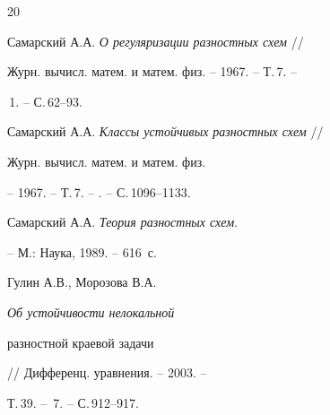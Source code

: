 \begin{thebibliography}{20}


Самарский А.А. {\em О регуляризации разностных схем} // 


Журн. вычисл. матем. и матем. физ. -- 1967. -- Т.\,7. --


\No\,1. -- С.\,62--93.







Самарский А.А. {\em Классы устойчивых разностных схем} //


Журн. вычисл. матем. и матем. физ.


-- 1967. -- Т.\,7. -- . -- С.\,1096--1133.







Самарский А.А. {\em Теория разностных схем}. 


-- М.: Наука, 1989. -- 616~с.







Гулин А.В., Морозова В.А. {\em Об устойчивости нелокальной


разностной краевой задачи} // Дифференц. уравнения. -- 2003. -- 


Т.\,39. -- \No\,7. -- С.\,912--917.








\end{thebibliography}





\vskip 2cm












\label{end}








